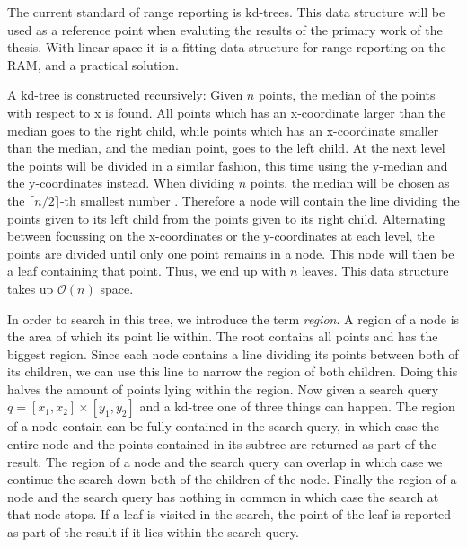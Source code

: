 The current standard of range reporting is kd-trees. This data structure will be used as a reference point when evaluting the results of the primary work of the thesis. With linear space it is a fitting data structure for range reporting on the RAM, and a practical solution.

A kd-tree is constructed recursively: Given $n$ points, the median of the points with respect to x is found. All points which has an x-coordinate larger than the median goes to the right child, while points which has an x-coordinate smaller than the median, and the median point, goes to the left child. At the next level the points will be divided in a similar fashion, this time using the y-median and the y-coordinates instead. When dividing $n$ points, the median will be chosen as the $\lceil n/2 \rceil$-th smallest number \cite{compgeo}. Therefore a node will contain the line dividing the points given to its left child from the points given to its right child.
Alternating between focussing on the x-coordinates or the y-coordinates at each level, the points are divided until only one point remains in a node. This node will then be a leaf containing that point. Thus, we end up with $n$ leaves. This data structure takes up $\mathcal{O}(n)$ space.

In order to search in this tree, we introduce the term \emph{region}. A region of a node is the area of which its point lie within. The root contains all points and has the biggest region. Since each node contains a line dividing its points between both of its children, we can use this line to narrow the region of both children. Doing this halves the amount of points lying within the region. Now given a search query $q = [x_1, x_2] \times [y_1, y_2]$ and a kd-tree one of three things can happen. The region of a node contain can be fully contained in the search query, in which case the entire node and the points contained in its subtree are returned as part of the result. The region of a node and the search query can overlap in which case we continue the search down both of the children of the node. Finally the region of a node and the search query has nothing in common in which case the search at that node stops. If a leaf is visited in the search, the point of the leaf is reported as part of the result if it lies within the search query. 

